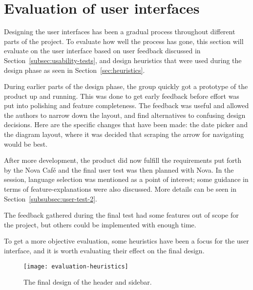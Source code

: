 
\section{Evaluation of user interfaces}\label{sec:evaluation}
Designing the user interfaces has been a gradual process throughout different
parts of the project.
To evaluate how well the process has gone, this section will evaluate on the
user interface based on user feedback discussed in Section~\ref{subsec:usability-tests},
and design heuristics that were used during the design phase as seen in Section~\ref{sec:heuristics}.

During earlier parts of the design phase, the group quickly got a prototype of
the product up and running.
This was done to get early feedback before effort was put into polishing and
feature completeness.
The feedback was useful and allowed the authors to narrow down the layout,
and find alternatives to confusing design decisions.
Here are the specific changes that have been made: the date picker and the
diagram layout, where it was decided that scraping the arrow for navigating
would be best.

After more development, the product did now fulfill the requirements put forth
by the Nova Café and the final user test was then planned with Nova.
In the session, language selection was mentioned as a point of interest; some
guidance in terms of feature-explanations were also discussed.
More details can be seen in Section~\ref{subsubsec:user-test-2}.

The feedback gathered during the final test had some features out of
scope for the project, but others could be implemented with enough time.

To get a more objective evaluation, some heuristics have been a focus for
the user interface, and it is worth evaluating their effect on the final design.

\begin{figure}
    \centering
    \texttt{[image: evaluation-heuristics]}
    \caption{The final design of the header and sidebar.
    }\label{fig:evaluation-heuristics}
\end{figure}

